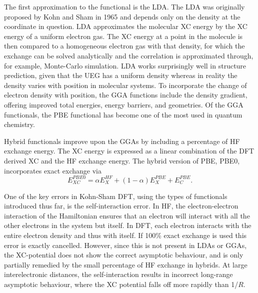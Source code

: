 The first approximation to the functional is the \ac{LDA}. The LDA was originally proposed by Kohn and Sham in 1965 and depends only on the density at the coordinate in question. LDA approximates the molecular \ac{XC} energy by the \ac{XC} energy of a uniform electron gas. The \ac{XC} energy at a point in the molecule is then compared to a homogeneous electron gas with that density, for which the exchange can be solved analytically and the correlation is approximated through, for example, Monte-Carlo simulation.\cite{Ullrich2012} LDA works surprisingly well in structure prediction, given that the UEG has a uniform density whereas in reality the density varies with position in molecular systems. To incorporate the change of electron density with position, the \ac{GGA} functions include the density gradient, offering improved total energies, energy barriers, and geometries. Of the \ac{GGA} functionals, the PBE functional has become one of the most used in quantum chemistry.\cite{Perdew1996}

Hybrid functionals improve upon the \ac{GGA}s by including a percentage of \ac{HF} exchange energy. The \ac{XC} energy is expressed as a linear combination of the \ac{DFT} derived \ac{XC} and the \ac{HF} exchange energy. The hybrid version of PBE, PBE0, incorporates exact exchange via
\begin{equation}
    E_{XC}^{PBE0}=\alpha{}E_{X}^{HF}+(1-\alpha{})E_{X}^{PBE}+E_{C}^{PBE}.
\end{equation}


One of the key errors in Kohn-Sham \ac{DFT}, using the types of functionals introduced thus far, is the self-interaction error. In \ac{HF}, the electron-electron interaction of the Hamiltonian ensures that an electron will interact with all the other electrons in the system but itself. In \ac{DFT}, each electron interacts with the entire electron density and thus with itself. If 100\% exact exchange is used this error is exactly cancelled. However, since this is not present in \ac{LDA}s or \ac{GGA}s, the \ac{XC}-potential does not show the correct asymptotic behaviour, and is only partially remedied by the small percentage of \ac{HF} exchange in hybrids. At large interelectronic distances, the self-interaction results in incorrect long-range asymptotic behaviour, where the \ac{XC} potential falls off more rapidly than 1/$R$.

